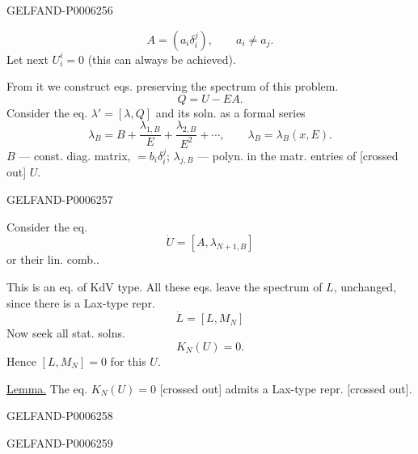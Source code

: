 \begin{GelfandAdjacentEvidence}{GELFAND-P000625}{6}

\[
A=(a_i\delta_i^j),\qquad a_i\ne a_j.
\]
Let next \(U_i^i=0\) (this can always be achieved).

From it we construct eqs. preserving the spectrum of this problem.
\[
Q=U-EA.
\]
Consider the eq. \(\lambda'=[\lambda,Q]\) and its soln. as a formal series
\begin{equation*}
\lambda_B=B+\frac{\lambda_{1,B}}{E}+\frac{\lambda_{2,B}}{E^2}+\cdots,
\qquad\lambda_B=\lambda_B(x,E).\tag{3}
\end{equation*}
\(B\) --- const. diag. matrix, \(=b_i\delta_i^j\);
\(\lambda_{j,B}\) --- polyn. in the matr. entries of [crossed out] \(U\).
\end{GelfandAdjacentEvidence}
\begin{GelfandAdjacentEvidence}{GELFAND-P000625}{7}


Consider the eq.
\begin{equation*}
\dot U=[A,\lambda_{N+1,B}]\tag{4}
\end{equation*}
or their lin. comb..

This is an eq. of KdV type.
All these eqs. leave the spectrum of \(L\), unchanged, since there is a Lax-type repr.
\begin{equation*}
\dot L=[L,M_N]\tag{5}
\end{equation*}
Now seek all stat. solns.
\begin{equation*}
K_N(U)=0.\tag{6}
\end{equation*}
Hence \([L,M_N]=0\) for this \(U\).

\underline{Lemma.}
The eq. \(K_N(U)=0\) [crossed out] admits a Lax-type repr. [crossed out].
\end{GelfandAdjacentEvidence}
\begin{GelfandAdjacentEvidence}{GELFAND-P000625}{8}

\end{GelfandAdjacentEvidence}
\begin{GelfandAdjacentEvidence}{GELFAND-P000625}{9}

\end{GelfandAdjacentEvidence}
